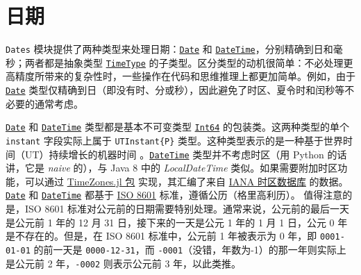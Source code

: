 \hypertarget{12670537780554709073}{}


\chapter{日期}





\texttt{Dates} 模块提供了两种类型来处理日期：\hyperlink{4488183467971164548}{\texttt{Date}} 和 \hyperlink{17572689933274889838}{\texttt{DateTime}}，分别精确到日和毫秒；两者都是抽象类型 \hyperlink{4438614350756187528}{\texttt{TimeType}} 的子类型。区分类型的动机很简单：不必处理更高精度所带来的复杂性时，一些操作在代码和思维推理上都更加简单。例如，由于 \hyperlink{4488183467971164548}{\texttt{Date}} 类型仅精确到日（即没有时、分或秒），因此避免了时区、夏令时和闰秒等不必要的通常考虑。



\hyperlink{4488183467971164548}{\texttt{Date}} 和 \hyperlink{17572689933274889838}{\texttt{DateTime}} 类型都是基本不可变类型 \hyperlink{7720564657383125058}{\texttt{Int64}} 的包装类。这两种类型的单个 \texttt{instant} 字段实际上属于 \texttt{UTInstant\{P\}} 类型。这种类型表示的是一种基于世界时间（UT）持续增长的机器时间 \footnotemark[1]。\hyperlink{17572689933274889838}{\texttt{DateTime}} 类型并不考虑时区（用 Python 的话讲，它是 \emph{naive} 的），与 Java 8 中的 \emph{LocalDateTime} 类似。如果需要附加时区功能，可以通过 \href{https://github.com/JuliaTime/TimeZones.jl/}{TimeZones.jl 包} 实现，其汇编了来自 \href{http://www.iana.org/time-zones}{IANA 时区数据库} 的数据。\hyperlink{4488183467971164548}{\texttt{Date}} 和 \hyperlink{17572689933274889838}{\texttt{DateTime}} 都基于 \href{https://en.wikipedia.org/wiki/ISO\_8601}{ISO 8601} 标准，遵循公历（格里高利历）。 值得注意的是，ISO 8601 标准对公元前的日期需要特别处理。通常来说，公元前的最后一天是公元前 1 年的 12 月 31 日，接下来的一天是公元 1 年的 1 月 1 日，公元 0 年是不存在的。但是，在 ISO 8601 标准中，公元前 1 年被表示为 0 年，即 \texttt{0001-01-01} 的前一天是 \texttt{0000-12-31}，而 \texttt{-0001}（没错，年数为-1）的那一年则实际上是公元前 2 年，\texttt{-0002} 则表示公元前 3 年，以此类推。





